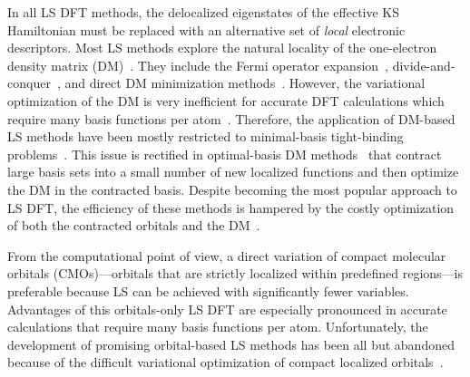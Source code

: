\documentclass[aps,prl,twocolumn,reprint,amsmath,amssymb]{revtex4-1}
\begin{document}
In all LS DFT methods, the delocalized eigenstates of the effective KS Hamiltonian must be replaced with an alternative set of \emph{local} electronic descriptors. 
Most LS methods explore the natural locality of the one-electron density matrix (DM)~\cite{li1993density, lee1996linear, li2003density, vandevondele2012linear, Kussmann2013, Aarons2016}.  
They include the Fermi operator expansion~\cite{goedecker1994efficient,goedecker1995tight}, divide-and-conquer~\cite{yang1991direct,yang1991local}, and direct DM minimization methods~\cite{li1993density, vandevondele2012linear}. 
However, the variational optimization of the DM is very inefficient for accurate DFT calculations which require many basis functions per atom~\cite{a:ls-dm-sign, Arita2014, a:ls-rev-2012, a:almo-ls}.
Therefore, the application of DM-based LS methods have been mostly restricted to minimal-basis tight-binding problems~\cite{Richters2014, example-of-a-large-scale-tight-binding}. 
This issue is rectified in optimal-basis DM methods~\cite{Skylaris2005, Nakata2015, Mohr2015} that contract large basis sets into a small number of new localized functions and then optimize the DM in the contracted basis. 
Despite becoming the most popular approach to LS DFT, the efficiency of these methods is hampered by the costly optimization of both the contracted orbitals and the DM~\cite{a:ls-onetep-2003}. 

From the computational point of view, a direct variation of compact molecular orbitals (CMOs)---orbitals that are strictly localized within predefined regions---is preferable because LS can be achieved with significantly fewer variables. 
Advantages of this orbitals-only LS DFT are especially pronounced in accurate calculations that require many basis functions per atom. 
Unfortunately, the development of promising orbital-based LS methods has been all but abandoned~\cite{a:weitao-yang-2013,a:ls-tsuchida-aomm} because of the difficult variational optimization of compact localized orbitals~\cite{a:ls-rev-1999,a:ls-mauri-galli-car-1993,a:ls-ordejon-1995,a:ls-fattebert-2004,a:weitao-yang-2013,a:ls-tsuchida-aomm}. 
\end{document}
